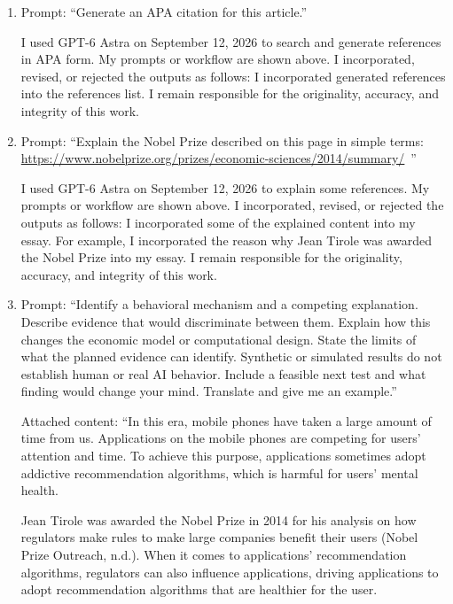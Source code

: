 \begin{enumerate}
\item Prompt: “Generate an APA citation for this article.”

I used GPT-6 Astra on September 12, 2026 to search and generate references in APA form. My prompts or workflow are shown above. I incorporated, revised, or rejected the outputs as follows: I incorporated generated references into the references list. I remain responsible for the originality, accuracy, and integrity of this work.


\item Prompt: “Explain the Nobel Prize described on this page in simple terms: {\def\UrlBreaks{\do a\do b\do c\do d\do e\do f\do g\do h\do i\do j\do k\do l\do m\do n\do o\do p\do q\do r\do s\do t\do u\do v\do w\do x\do y\do z\do A\do B\do C\do D\do E\do F\do G\do H\do I\do J\do K\do L\do M\do N\do O\do P\do Q\do R\do S\do T\do U\do V\do W\do X\do Y\do Z\do 0\do 1\do 2\do 3\do 4\do 5\do 6\do 7\do 8\do 9\do /\do -\do _\do .\do ?\do =\do &}\url{https://www.nobelprize.org/prizes/economic-sciences/2014/summary/}}~”

I used GPT-6 Astra on September 12, 2026 to explain some references. My prompts or workflow are shown above. I incorporated, revised, or rejected the outputs as follows: I incorporated some of the explained content into my essay. For example, I incorporated the reason why Jean Tirole was awarded the Nobel Prize into my essay. I remain responsible for the originality, accuracy, and integrity of this work.


\item Prompt: “Identify a behavioral mechanism and a competing explanation. Describe evidence that would discriminate between them. Explain how this changes the economic model or computational design. State the limits of what the planned evidence can identify. Synthetic or simulated results do not establish human or real AI behavior. Include a feasible next test and what finding would change your mind. Translate and give me an example.”

Attached content: “In this era, mobile phones have taken a large amount of time from us. Applications on the mobile phones are competing for users’ attention and time. To achieve this purpose, applications sometimes adopt addictive recommendation algorithms, which is harmful for users’ mental health.

Jean Tirole was awarded the Nobel Prize in 2014 for his analysis on how regulators make rules to make large companies benefit their users (Nobel Prize Outreach, n.d.). When it comes to applications’ recommendation algorithms, regulators can also influence applications, driving applications to adopt recommendation algorithms that are healthier for the user.


\end{enumerate}
